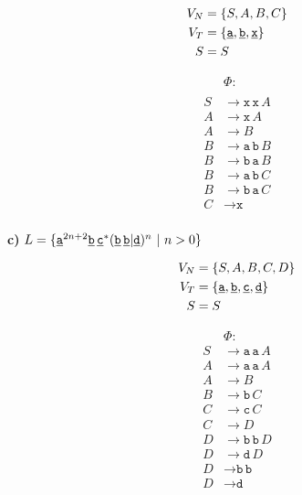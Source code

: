 \documentclass[10pt, a4paper]{article}
\begin{document}
\begin{align*}
V_N &= \{ S, A, B, C \} \\
V_T &= \{ \underline{\texttt{a}}, \underline{\texttt{b}}, \underline{\texttt{x}} \} \\
S  &= S
\end{align*}

\[
\begin{array}{rl}
& \Phi:     \\
& \\
S &\rightarrow \texttt{x}\,\texttt{x}\,A \\
A &\rightarrow \texttt{x}\,A \\
A &\rightarrow B \\
B &\rightarrow \texttt{a}\,\texttt{b}\,B \\
B &\rightarrow \texttt{b}\,\texttt{a}\,B \\
B &\rightarrow \texttt{a}\,\texttt{b}\,C \\
B &\rightarrow \texttt{b}\,\texttt{a}\,C \\
C &\rightarrow \texttt{x} \\
\end{array}
\]

\newpage


\textbf{c)}     \hspace{5.5cm}  $L = \{\underline{\texttt{a}}^{2n+2} \underline{\texttt{b}} \, \underline{\texttt{c}}^{*}  (\underline{\texttt{b}}\,\underline{\texttt{b}}|\underline{\texttt{d}})^{n}  \ | \ n > 0\}$

\begin{align*}
V_N &= \{ S, A, B, C, D \} \\
V_T &= \{ \underline{\texttt{a}}, \underline{\texttt{b}}, \underline{\texttt{c}}, \underline{\texttt{d}} \} \\
S  &= S
\end{align*}

\[
\begin{array}{rl}
& \Phi:     \\
S &\rightarrow \texttt{a}\,\texttt{a}\,A \\
A &\rightarrow \texttt{a}\,\texttt{a}\,A \\
A &\rightarrow B \\
B &\rightarrow \texttt{b}\,C \\
C &\rightarrow \texttt{c}\,C \\
C &\rightarrow D \\
D &\rightarrow \texttt{b}\,\texttt{b}\,D \\
D &\rightarrow \texttt{d}\,D \\
D &\rightarrow \texttt{b}\,\texttt{b} \\
D &\rightarrow \texttt{d} \\
\end{array}
\]
\end{document}
